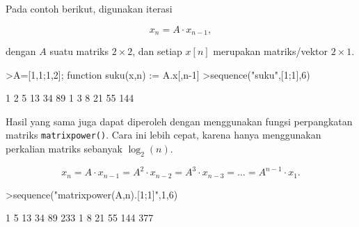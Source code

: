 \documentclass[a4paper,11pt,oneside,enabledeprecatedfontcommands]{scrbook}
\newenvironment{eulernotebook}{}{}
\newenvironment{eulercomment}{\par\medskip\noindent}{\par\medskip}
\newenvironment{eulerformula}{}{}
\begin{document}
\begin{eulernotebook}
\begin{eulercomment}
Pada contoh berikut, digunakan iterasi
\end{eulercomment}
\begin{eulerformula}
\[
x_n =A \cdot x_{n-1},
\]
\end{eulerformula}
\begin{eulercomment}
dengan $A$ suatu matriks $2\times 2$, dan setiap $x[n]$ merupakan matriks/vektor $2\times 1$.
\end{eulercomment}
\begin{eulerprompt}
>A=[1,1;1,2]; function suku(x,n) := A.x[,n-1]
>sequence("suku",[1;1],6)
\end{eulerprompt}
\begin{euleroutput}
              1             2             5            13            34            89 
              1             3             8            21            55           144 
\end{euleroutput}
\begin{eulercomment}
Hasil yang sama juga dapat diperoleh dengan menggunakan fungsi perpangkatan matriks \texttt{matrixpower()}. Cara ini lebih cepat, karena hanya menggunakan perkalian matriks sebanyak $\log_2(n)$.
\end{eulercomment}
\begin{eulerformula}
\[
x_n=A\cdot x_{n-1}=A^2\cdot x_{n-2}=A^3\cdot x_{n-3}= \dots = A^{n-1}\cdot x_1.
\]
\end{eulerformula}
\begin{eulerprompt}
>sequence("matrixpower(A,n).[1;1]",1,6)
\end{eulerprompt}
\begin{euleroutput}
              1             5            13            34            89           233 
              1             8            21            55           144           377 
\end{euleroutput}


\end{eulernotebook}
\end{document}
